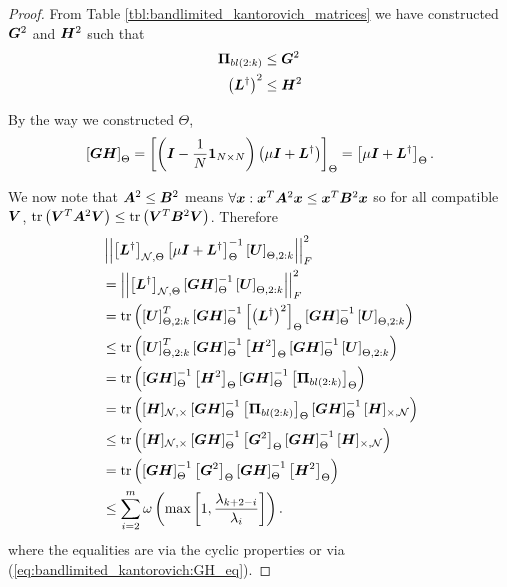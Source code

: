 \begin{proof}
From Table \ref{tbl:bandlimited_kantorovich_matrices} we have constructed $\bm{G}^{2}$ and $\bm{H}^{2}$ such that
\begin{align}
    \projgen{bl(2:k)} &\leq \matr{G}^{2} \\
    \left(\matr{L}^{\dagger}\right)^{2} &\leq \matr{H}^{2}
\end{align}

By the way we constructed ${\Theta}$,
    \begin{equation}
        \msubgen[\Theta]{\matr{G}\matr{H}} = \msubgen[\Theta]{\left(\matr{I} - \frac{1}{N}\vect{1}_{N\times N}\right)\left(\mu\matr{I} + \matr{L}^{\dagger} \right)} = \msubgen[\Theta]{\mu\matr{I} + \matr{L}^{\dagger} }. \label{eq:bandlimited_kantorovich:GH_eq}
    \end{equation}

We now note that $\bm{A}^{2} \leq \bm{B}^{2}$ means $\forall \bm{x}: \bm{x}^{T}\bm{A}^{2}\bm{x} \leq \bm{x}^{T}\bm{B}^{2}\bm{x}$ so  for all compatible $\bm{V}$, $\textrm{tr}\left(\bm{V}^{T}\bm{A}^{2}\bm{V}\right) \leq \textrm{tr}\left(\bm{V}^{T}\bm{B}^{2}\bm{V}\right)$. Therefore
\begin{align}
    &\sqfrob{\msubgen[\set{N}, \Theta]{\matr{L}^{\dagger}}\msubgen[\Theta]{\mu\matr{I} + \matr{L}^{\dagger}}^{-1}\msubgen[\Theta, 2:k]{\matr{U}}} \\
    &=\sqfrob{\msubgen[\set{N}, \Theta]{\matr{L}^{\dagger}}\msubgen[\Theta]{\matr{G}\matr{H}}^{-1}\msubgen[\Theta, 2:k]{\matr{U}}} \\
    &= \trace{\msubgen[\Theta, 2:k]{\matr{U}}^{T}\msubgen[\Theta]{\matr{G}\matr{H}}^{-1}\msubgen[ \Theta]{\left(\matr{L}^{\dagger}\right)^{2}}\msubgen[\Theta]{\matr{G}\matr{H}}^{-1}\msubgen[\Theta, 2:k]{\matr{U}}} \\
    &\leq \trace{\msubgen[\Theta, 2:k]{\matr{U}}^{T}\msubgen[\Theta]{\matr{G}\matr{H}}^{-1}\msubgen[ \Theta]{\matr{H}^{2}}\msubgen[\Theta]{\matr{G}\matr{H}}^{-1}\msubgen[\Theta, 2:k]{\matr{U}}} \\
    &= \trace{\msubgen[\Theta]{\matr{G}\matr{H}}^{-1}\msubgen[ \Theta]{\matr{H}^{2}}\msubgen[\Theta]{\matr{G}\matr{H}}^{-1}\msubgen[\Theta]{\projgen{bl(2:k)}}} \\
    &= \trace{\matrsub[N,\Theta]{H}\msubgen[\Theta]{\matr{G}\matr{H}}^{-1}\msubgen[\Theta]{\projgen{bl(2:k)}} \msubgen[\Theta]{\matr{G}\matr{H}}^{-1}\matrsub[\Theta,N]{H} } \\
    &\leq \trace{\matrsub[N,\Theta]{H}\msubgen[\Theta]{\matr{G}\matr{H}}^{-1}\msubgen[\Theta]{\matr{G}^{2}} \msubgen[\Theta]{\matr{G}\matr{H}}^{-1}\matrsub[\Theta,N]{H} } \\
    &= \trace{\msubgen[\Theta]{\matr{G}\matr{H}}^{-1}\msubgen[\Theta]{\matr{G}^{2}} \msubgen[\Theta]{\matr{G}\matr{H}}^{-1}\msubgen[\Theta]{\matr{H}^{2}} } \\
    &\leq \sum^{m}_{i=2}\omega\left(\max\left[1,\frac{\lambda_{k+2-i}}{\lambda_{i}}\right]\right).
\end{align}
where the equalities are via the cyclic properties or via (\ref{eq:bandlimited_kantorovich:GH_eq}).


\end{proof}
